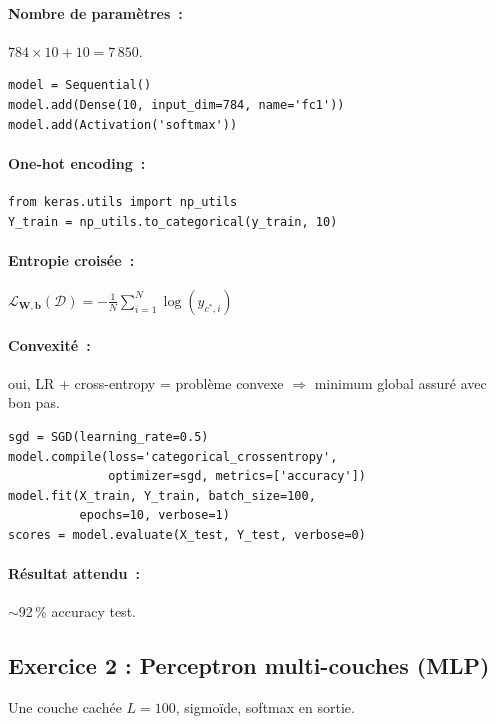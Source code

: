 \documentclass[a4paper,11pt]{article}
\theoremstyle{definition}
\theoremstyle{remark}
\begin{document}
\paragraph{Nombre de param\`etres~:} $784\times 10 + 10 = 7\,850$.

\begin{lstlisting}
model = Sequential()
model.add(Dense(10, input_dim=784, name='fc1'))
model.add(Activation('softmax'))
\end{lstlisting}

\paragraph{One-hot encoding~:}
\begin{lstlisting}
from keras.utils import np_utils
Y_train = np_utils.to_categorical(y_train, 10)
\end{lstlisting}

\paragraph{Entropie crois\'ee~:}
$\mathcal{L}_{\mathbf{W},\mathbf{b}}(\mathcal{D}) =
-\frac{1}{N}\sum_{i=1}^N \log(\hat{y}_{c^*,i})$

\paragraph{Convexit\'e~:} oui, LR + cross-entropy = probl\`eme
convexe $\Rightarrow$ minimum global assur\'e avec bon pas.

\begin{lstlisting}
sgd = SGD(learning_rate=0.5)
model.compile(loss='categorical_crossentropy',
              optimizer=sgd, metrics=['accuracy'])
model.fit(X_train, Y_train, batch_size=100,
          epochs=10, verbose=1)
scores = model.evaluate(X_test, Y_test, verbose=0)
\end{lstlisting}

\paragraph{R\'esultat attendu~:} $\sim$92\,\% accuracy test.

\subsection{Exercice 2 : Perceptron multi-couches (MLP)}

Une couche cach\'ee $L=100$, sigmo\"ide, softmax en sortie.
\end{document}
